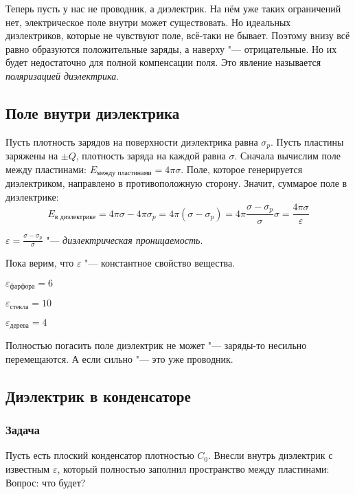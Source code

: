     Теперь пусть у нас не проводник, а диэлектрик.
    На нём уже таких ограничений нет, электрическое поле внутри может существовать.
    Но идеальных диэлектриков, которые не чувствуют поле, всё-таки не бывает.
    Поэтому внизу всё равно образуются положительные заряды, а наверху "--- отрицательные.
    Но их будет недостаточно для полной компенсации поля.
    Это явление называется \textit{поляризацией диэлектрика}.

  \subsection{Поле внутри диэлектрика}
    Пусть плотность зарядов на поверхности диэлектрика равна $\sigma_p$.
    Пусть пластины заряжены на $\pm Q$, плотность заряда на каждой равна $\sigma$.
    Сначала вычислим поле между пластинами: $E_{\text{между пластинами}} = 4\pi \sigma$.
    Поле, которое генерируется диэлектриком, направлено в противоположную сторону.
    Значит, суммарое поле в диэлектрике:
    \[ E_\text{в диэлектрике}
        = 4\pi\sigma - 4\pi\sigma_p
        = 4\pi(\sigma - \sigma_p)
        = 4\pi\frac{\sigma - \sigma_p}{\sigma}\sigma
        = \frac{4\pi\sigma}{\varepsilon}
    \]
    \begin{Def}
      $\varepsilon = \frac{\sigma - \sigma_p}{\sigma}$ "--- \textit{диэлектрическая проницаемость}.
    \end{Def}
    \begin{Rem}
      Пока верим, что $\varepsilon$ "--- константное свойство вещества.
    \end{Rem}
    \begin{exmp}$\varepsilon_\text{фарфора} = 6$\end{exmp}
    \begin{exmp}$\varepsilon_\text{стекла} = 10$\end{exmp}
    \begin{exmp}$\varepsilon_\text{дерева} = 4$\end{exmp}
    \begin{Rem}
      Полностью погасить поле диэлектрик не может "--- заряды-то несильно перемещаются.
      А если сильно "--- это уже проводник.
    \end{Rem}

  \subsection{Диэлектрик в конденсаторе}
    \subsubsection{Задача}
      Пусть есть плоский конденсатор плотностью $C_0$.
      Внесли внутрь диэлектрик с известным $\varepsilon$, который полностью заполнил пространство между пластинами:
      Вопрос: что будет?

